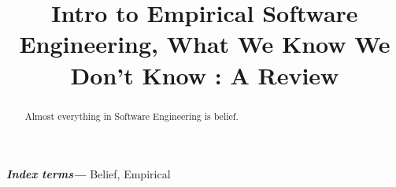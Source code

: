 \documentclass[conference, compsoc, twoside]{IEEEtran}
\begin{document}
\preto\tabular{\setcounter{magicrownumbers}{0}}
\newcommand\rownumber{\stepcounter{magicrownumbers}\arabic{magicrownumbers}}
\title{\Huge Intro to Empirical Software Engineering, What We Know We Don't Know : A Review}
\author{
}

\maketitle
\providecommand{\keywords}[1]{\textbf{\textit{Index terms---}} #1}
\begin{abstract}
Almost everything in Software Engineering is belief.
\end{abstract}

\keywords{Belief, Empirical}
\IEEEpeerreviewmaketitle
\end{document}
